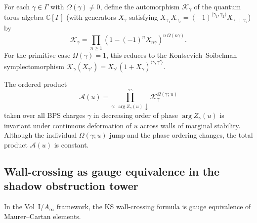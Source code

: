 \begin{definition}
\label{def:phys-bps-auto}
For each $\gamma \in \Gamma$ with $\Omega(\gamma) \neq 0$, define the
automorphism $\mathcal{K}_\gamma$ of the quantum torus algebra $\mathbb{C}[\Gamma]$
(with generators $X_\gamma$ satisfying
$X_{\gamma_1} X_{\gamma_2} = (-1)^{\langle\gamma_1,\gamma_2\rangle} X_{\gamma_1+\gamma_2}$)
by
\begin{equation}\label{eq:phys-ks-automorphism}
 \mathcal{K}_\gamma = \prod_{n \geq 1}(1 - (-1)^n X_{n\gamma})^{n\,\Omega(n\gamma)}.
\end{equation}
For the primitive case $\Omega(\gamma) = 1$, this reduces to the
Kontsevich--Soibelman symplectomorphism
$\mathcal{K}_\gamma(X_{\gamma'}) = X_{\gamma'}(1 + X_\gamma)^{\langle\gamma,\gamma'\rangle}$.
\end{definition}

\begin{theorem}
\label{thm:phys-ks-wcf}
The ordered product
\begin{equation}\label{eq:phys-ks-product}
 \mathcal{A}(u) = \prod_{\gamma:\,\arg Z_\gamma(u)\,\downarrow}^{\curvearrowleft}
 \mathcal{K}_\gamma^{\Omega(\gamma;\,u)}
\end{equation}
taken over all BPS charges $\gamma$ in decreasing order of phase $\arg Z_\gamma(u)$
is invariant under continuous deformation of $u$ across walls of marginal stability.
Although the individual $\Omega(\gamma; u)$ jump and the phase ordering changes,
the total product $\mathcal{A}(u)$ is constant.
\end{theorem}

\subsection{Wall-crossing as gauge equivalence in the shadow obstruction tower}
\label{subsec:phys-wc-mc-id}

In the Vol~I/$A_\infty$ framework, the KS wall-crossing formula is gauge
equivalence of Maurer--Cartan elements.


